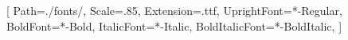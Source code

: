 \usepackage{fontspec}

\setmonofont{JetBrainsMono}[
    Path=./fonts/,
    Scale=.85,
    Extension=.ttf,
    UprightFont=*-Regular,
    BoldFont=*-Bold,
    ItalicFont=*-Italic,
    BoldItalicFont=*-BoldItalic,
]